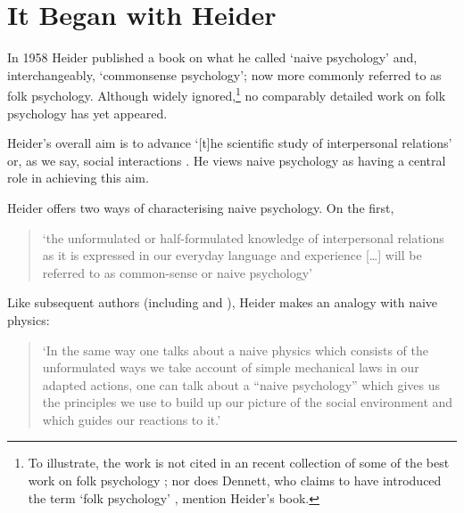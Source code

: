 \documentclass[12pt,\papersize]{extarticle}
\newif\iffoot
\let\origfootnote\footnote
\renewcommand{\footnote}[1]{\foottrue\origfootnote{#1}\footfalse}
\begin{document}
\setlength\footnotesep{1em}


\date{ Saturday, 12th November 2022 } %
\maketitle

\tableofcontents 


\pagebreak






\hypertarget{it-began-with-heider}{%
\section{It Began with Heider}\label{it-began-with-heider}}

\label{unit:../../heider}

In 1958 Heider published a book on what he called `naive psychology' and, interchangeably, `commonsense psychology'; now more commonly referred to as folk psychology. Although widely ignored,\footnote{To illustrate, the work is not cited in an recent collection of some of the best work on folk psychology \citep{hutto:2007_folk}; nor does Dennett, who claims to have introduced the term `folk psychology' \citep[pp.~73--74]{dennett:2014_intuition}, mention Heider's book.} no comparably detailed work on folk psychology has yet appeared.

Heider's overall aim is to advance `{[}t{]}he scientific study of interpersonal relations' or, as we say, social interactions \citep[p.~3]{heider:1958_psychology}. He views naive psychology as having a central role in achieving this aim.

Heider offers two ways of characterising naive psychology. On the first,

\begin{quote}
`the unformulated or half-formulated knowledge of interpersonal relations as it is expressed in our everyday language and experience {[}\ldots{]} will be referred to as common-sense or naive psychology' \citep[p.~4]{heider:1958_psychology}
\end{quote}

Like subsequent authors (including \citet[p.~140]{clark:1987_folk} and \citet[pp.~73--74]{dennett:2014_intuition}), Heider makes an analogy with naive physics:

\begin{quote}
`In the same way one talks about a naive physics which consists of the unformulated ways we take account of simple mechanical laws in our adapted actions, one can talk about a ``naive psychology'' which gives us the principles we use to build up our picture of the social environment and which guides our reactions to it.' \citep[p.~5]{heider:1958_psychology}
\end{quote}
\end{document}
